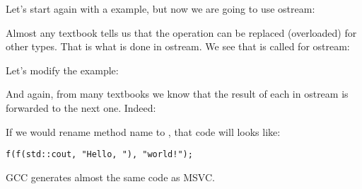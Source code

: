 
Let's start again with a  example, but now we are going to use ostream:



Almost any \Cpp textbook tells us that the \TT{<<} operation can be replaced (overloaded) for other types.
That is what is done in ostream.
We see that  is called for ostream:



Let's modify the example:



And again, from many \Cpp textbooks we know that the result of each  in ostream is forwarded to the
next one.
Indeed:



If we would rename  method name to \ttf{}, that code will looks like:

\begin{lstlisting}
f(f(std::cout, "Hello, "), "world!");
\end{lstlisting}

GCC generates almost the same code as MSVC.

